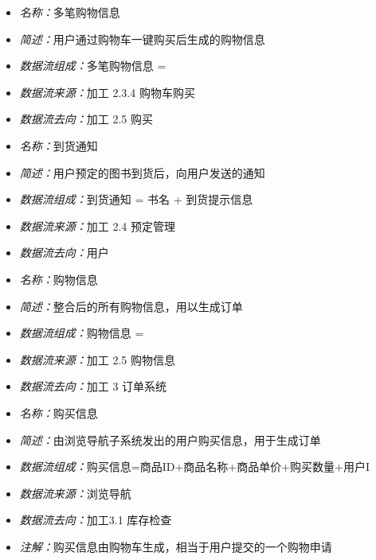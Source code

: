 \vspace{-1mm}

\begin{itemize}
	\item \textit{名称：}多笔购物信息
	\item \textit{简述：}用户通过购物车一键购买后生成的购物信息
	\item \textit{数据流组成：}多笔购物信息 = 
	\item \textit{数据流来源：}加工 2.3.4 购物车购买
	\item \textit{数据流去向：}加工 2.5 购买
\end{itemize}

\vspace{-1mm}

\begin{itemize}
	\item \textit{名称：}到货通知
	\item \textit{简述：}用户预定的图书到货后，向用户发送的通知
	\item \textit{数据流组成：}到货通知 = 书名 + 到货提示信息
	\item \textit{数据流来源：}加工 2.4 预定管理
	\item \textit{数据流去向：}用户
\end{itemize}

\vspace{-1mm}

\begin{itemize}
	\item \textit{名称：}购物信息
	\item \textit{简述：}整合后的所有购物信息，用以生成订单
	\item \textit{数据流组成：}购物信息 =
	\item \textit{数据流来源：}加工 2.5 购物信息
	\item \textit{数据流去向：}加工 3 订单系统
\end{itemize}

\vspace{-1mm}

\begin{itemize}
	\item \textit{名称：}购买信息
	\item \textit{简述：}由浏览导航子系统发出的用户购买信息，用于生成订单
	\item \textit{数据流组成：}购买信息=商品ID+商品名称+商品单价+购买数量+用户I
	\item \textit{数据流来源：}浏览导航
	\item \textit{数据流去向：}加工3.1 库存检查
	\item \textit{注解：}购买信息由购物车生成，相当于用户提交的一个购物申请
\end{itemize}

